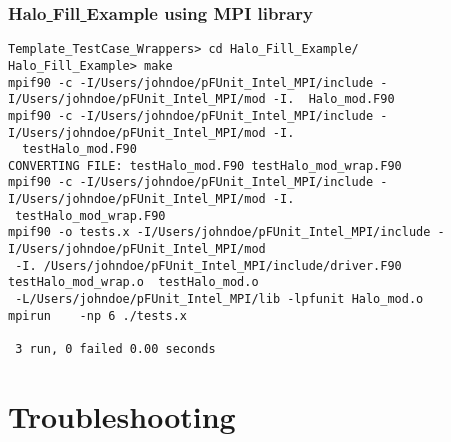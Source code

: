 \documentclass[10pt]{article}
\begin{document}
\subsubsection{Halo\underline{ }Fill\underline{ }Example using MPI library}

{\small \begin{verbatim}
Template_TestCase_Wrappers> cd Halo_Fill_Example/
Halo_Fill_Example> make
mpif90 -c -I/Users/johndoe/pFUnit_Intel_MPI/include -I/Users/johndoe/pFUnit_Intel_MPI/mod -I.  Halo_mod.F90
mpif90 -c -I/Users/johndoe/pFUnit_Intel_MPI/include -I/Users/johndoe/pFUnit_Intel_MPI/mod -I.
  testHalo_mod.F90
CONVERTING FILE: testHalo_mod.F90 testHalo_mod_wrap.F90
mpif90 -c -I/Users/johndoe/pFUnit_Intel_MPI/include -I/Users/johndoe/pFUnit_Intel_MPI/mod -I. 
 testHalo_mod_wrap.F90
mpif90 -o tests.x -I/Users/johndoe/pFUnit_Intel_MPI/include -I/Users/johndoe/pFUnit_Intel_MPI/mod
 -I. /Users/johndoe/pFUnit_Intel_MPI/include/driver.F90  testHalo_mod_wrap.o  testHalo_mod.o 
 -L/Users/johndoe/pFUnit_Intel_MPI/lib -lpfunit Halo_mod.o
mpirun    -np 6 ./tests.x     
 
 3 run, 0 failed 0.00 seconds
\end{verbatim}
}

\section{Troubleshooting}
\end{document}

